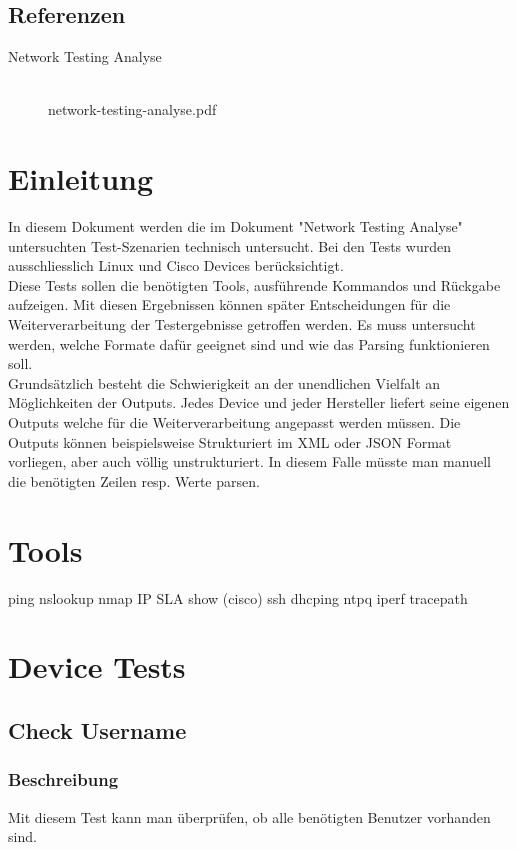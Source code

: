\documentclass[a4,12pt]{scrartcl}
\begin{document}
\subsection{Referenzen}
\begin{description}
  \item[Network Testing Analyse] \hfill \\
  network-testing-analyse.pdf \\
\end{description}
\newpage
\section{Einleitung}
In diesem Dokument werden die im Dokument "Network Testing Analyse" untersuchten Test-Szenarien technisch untersucht. Bei den Tests wurden ausschliesslich Linux und Cisco Devices berücksichtigt.\\

\noindent Diese Tests sollen die benötigten Tools, ausführende Kommandos und Rückgabe aufzeigen. Mit diesen Ergebnissen können später Entscheidungen für die Weiterverarbeitung der Testergebnisse getroffen werden. Es muss untersucht werden, welche Formate dafür geeignet sind und wie das Parsing funktionieren soll.\\

\noindent Grundsätzlich besteht die Schwierigkeit an der unendlichen Vielfalt an Möglichkeiten der Outputs. Jedes Device und jeder Hersteller liefert seine eigenen Outputs welche für die Weiterverarbeitung angepasst werden müssen. Die Outputs können beispielsweise Strukturiert im XML oder JSON Format vorliegen, aber auch völlig unstrukturiert. In diesem Falle müsste man manuell die benötigten Zeilen resp. Werte parsen.

\newpage
\section{Tools}

ping
nslookup
nmap
IP SLA
show (cisco)
ssh
dhcping
ntpq
iperf
tracepath
\newpage
\section{Device Tests}

\subsection{Check Username}
\subsubsection{Beschreibung}
Mit diesem Test kann man überprüfen, ob alle benötigten Benutzer vorhanden sind.
\end{document}
